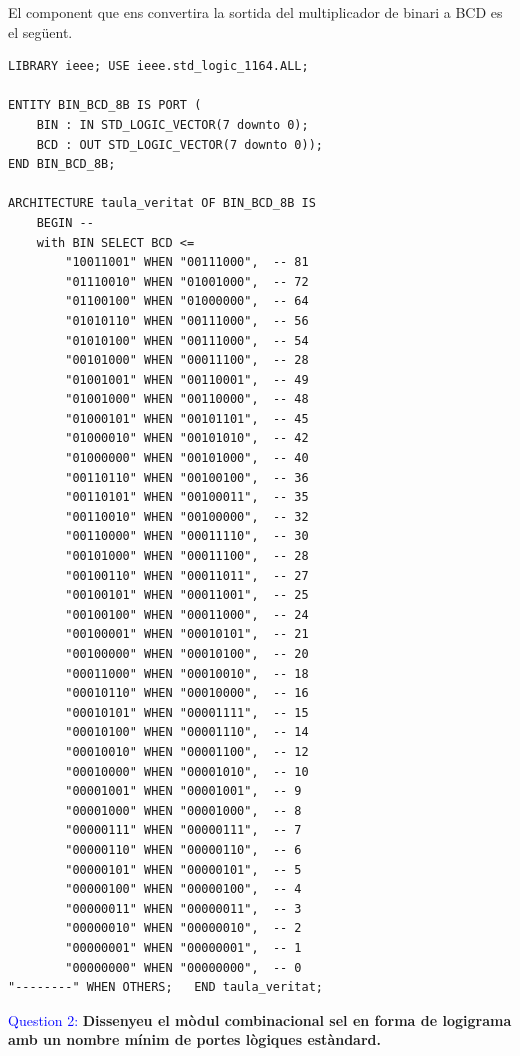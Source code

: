 \documentclass[12pt, a4papre]{article}
\begin{document}
	El component que ens convertira la sortida del multiplicador de binari a BCD es el següent.
	\newpage
	\begin{lstlisting}[style=vhdl, frame=single, basicstyle=\small]
LIBRARY ieee; USE ieee.std_logic_1164.ALL;  

ENTITY BIN_BCD_8B IS PORT (   
	BIN : IN STD_LOGIC_VECTOR(7 downto 0);   
	BCD : OUT STD_LOGIC_VECTOR(7 downto 0)); 
END BIN_BCD_8B;  

ARCHITECTURE taula_veritat OF BIN_BCD_8B IS   
	BEGIN --  
	with BIN SELECT BCD <=     	
		"10011001" WHEN "00111000",  -- 81     
		"01110010" WHEN "01001000",  -- 72      
		"01100100" WHEN "01000000",  -- 64     
		"01010110" WHEN "00111000",  -- 56     
		"01010100" WHEN "00111000",  -- 54     
		"00101000" WHEN "00011100",  -- 28     
		"01001001" WHEN "00110001",  -- 49     
		"01001000" WHEN "00110000",  -- 48     
		"01000101" WHEN "00101101",  -- 45     
		"01000010" WHEN "00101010",  -- 42     
		"01000000" WHEN "00101000",  -- 40     
		"00110110" WHEN "00100100",  -- 36     
		"00110101" WHEN "00100011",  -- 35     
		"00110010" WHEN "00100000",  -- 32     
		"00110000" WHEN "00011110",  -- 30     
		"00101000" WHEN "00011100",  -- 28     
		"00100110" WHEN "00011011",  -- 27     
		"00100101" WHEN "00011001",  -- 25     
		"00100100" WHEN "00011000",  -- 24     
		"00100001" WHEN "00010101",  -- 21     
		"00100000" WHEN "00010100",  -- 20     
		"00011000" WHEN "00010010",  -- 18     
		"00010110" WHEN "00010000",  -- 16     
		"00010101" WHEN "00001111",  -- 15     
		"00010100" WHEN "00001110",  -- 14     
		"00010010" WHEN "00001100",  -- 12     
		"00010000" WHEN "00001010",  -- 10     
		"00001001" WHEN "00001001",  -- 9     
		"00001000" WHEN "00001000",  -- 8     
		"00000111" WHEN "00000111",  -- 7     
		"00000110" WHEN "00000110",  -- 6     
		"00000101" WHEN "00000101",  -- 5     
		"00000100" WHEN "00000100",  -- 4    
		"00000011" WHEN "00000011",  -- 3     
		"00000010" WHEN "00000010",  -- 2     
		"00000001" WHEN "00000001",  -- 1     
		"00000000" WHEN "00000000",  -- 0     
"--------" WHEN OTHERS;   END taula_veritat;
\end{lstlisting}

	\textcolor{blue}{Question 2:} \textbf{Dissenyeu el mòdul combinacional sel en forma de logigrama amb un nombre mínim de portes lògiques estàndard.}
\end{document}

